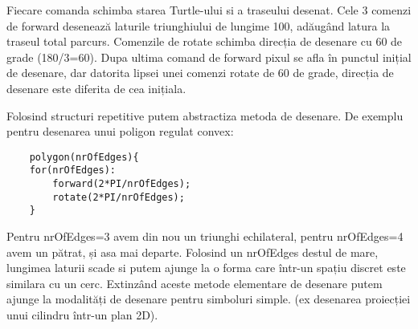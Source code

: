 Fiecare comanda schimba starea Turtle-ului si a traseului desenat. 
Cele 3 comenzi de forward desenează laturile triunghiului de lungime 100, adăugând latura la traseul total parcurs. 
Comenzile de rotate schimba direcția de desenare cu 60 de grade (180/3=60). 
Dupa ultima comand de forward pixul se afla în punctul inițial de desenare, dar datorita lipsei unei comenzi rotate de 60 de grade, 
direcția de desenare este diferita de cea inițiala.\newline

Folosind structuri repetitive putem abstractiza metoda de desenare. De exemplu pentru desenarea unui poligon regulat convex:

\begin{lstlisting}
    polygon(nrOfEdges){
    for(nrOfEdges):
        forward(2*PI/nrOfEdges);
        rotate(2*PI/nrOfEdges);	
    }
\end{lstlisting}

Pentru nrOfEdges=3 avem din nou un triunghi echilateral, pentru nrOfEdges=4 avem un pătrat, și asa mai departe. 
Folosind un nrOfEdges destul de mare, lungimea laturii scade si  putem ajunge la o forma care într-un spațiu discret 
este similara cu un cerc. Extinzând aceste metode elementare de desenare putem ajunge la modalități de desenare pentru simboluri simple. 
(ex desenarea proiecției unui cilindru într-un plan 2D). 
